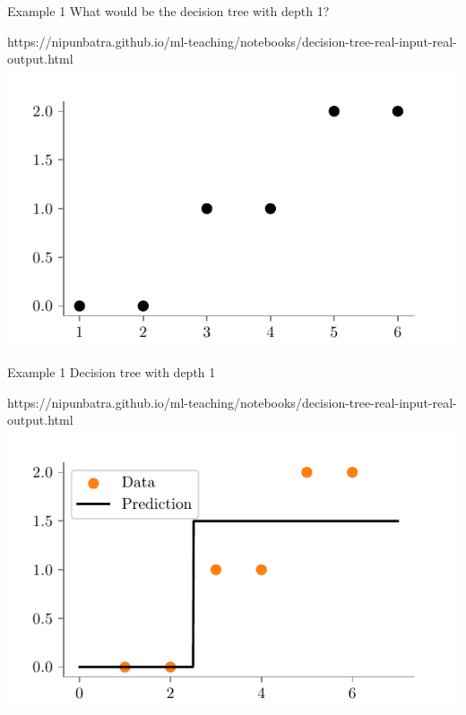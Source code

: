 \documentclass[usenames,dvipsnames]{beamer}
\begin{document}
    \begin{frame}{Example 1}
    What would be the decision tree with depth 1?
    \begin{center}
    	\begin{notebookbox}{https://nipunbatra.github.io/ml-teaching/notebooks/decision-tree-real-input-real-output.html}
    		\includegraphics{../assets/decision-trees/figures/ri-ro-dataset.pdf}
    	  \end{notebookbox}
    \end{center}
    \end{frame}

    \begin{frame}{Example 1}
    Decision tree with depth 1
    \begin{center}
    	\begin{notebookbox}{https://nipunbatra.github.io/ml-teaching/notebooks/decision-tree-real-input-real-output.html}
    		\includegraphics{../assets/decision-trees/figures/ri-ro-depth-1.pdf}
    	\end{notebookbox}	
    \end{center}
    \end{frame}
\end{document}

